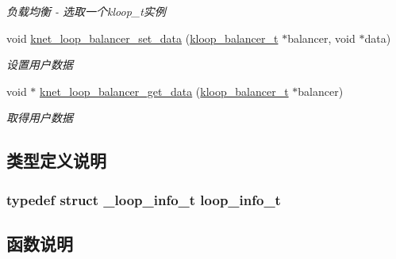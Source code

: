\begin{DoxyCompactItemize}
\begin{DoxyCompactList}\small\item\em 负载均衡 -\/ 选取一个kloop\+\_\+t实例 \end{DoxyCompactList}\item 
void \hyperlink{a00106_ga476aeb9c1ab507c2af581b9ceb66b261_ga476aeb9c1ab507c2af581b9ceb66b261}{knet\+\_\+loop\+\_\+balancer\+\_\+set\+\_\+data} (\hyperlink{a00051_abd3f964265beb2f8984e76f44fb5ea33_abd3f964265beb2f8984e76f44fb5ea33}{kloop\+\_\+balancer\+\_\+t} $\ast$balancer, void $\ast$data)
\begin{DoxyCompactList}\small\item\em 设置用户数据 \end{DoxyCompactList}\item 
void $\ast$ \hyperlink{a00106_gaf4fab99f76529f2381418ff4f0692a68_gaf4fab99f76529f2381418ff4f0692a68}{knet\+\_\+loop\+\_\+balancer\+\_\+get\+\_\+data} (\hyperlink{a00051_abd3f964265beb2f8984e76f44fb5ea33_abd3f964265beb2f8984e76f44fb5ea33}{kloop\+\_\+balancer\+\_\+t} $\ast$balancer)
\begin{DoxyCompactList}\small\item\em 取得用户数据 \end{DoxyCompactList}\end{DoxyCompactItemize}


\subsection{类型定义说明}
\hypertarget{a00072_a4ae76cfed863999ec747314b93b9287d_a4ae76cfed863999ec747314b93b9287d}{}
\subsubsection[{loop\+\_\+info\+\_\+t}]{\setlength{\rightskip}{0pt plus 5cm}typedef struct {\bf \+\_\+loop\+\_\+info\+\_\+t}  {\bf loop\+\_\+info\+\_\+t}}\label{a00072_a4ae76cfed863999ec747314b93b9287d_a4ae76cfed863999ec747314b93b9287d}


\subsection{函数说明}
\hypertarget{a00106_ga647f8a2d39c97c8759f8768ebc612b98_ga647f8a2d39c97c8759f8768ebc612b98}{}
